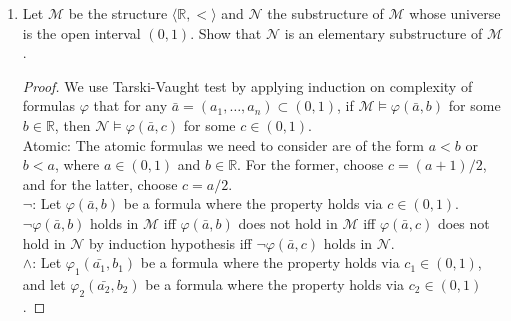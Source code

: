 \documentclass{article}
\begin{document}
\begin{enumerate}
\begin{enumerate}
\begin{proof}
          For each $n\in\mathbb{N}\setminus\{0,1\}$, $S_n$ is unique,
          hence we have infinitely many minimal definable and infinite
          subsets $S_n$.
        \end{proof}
    \end{enumerate}

  \item Let $\mathcal{M}$ be the structure
    $\langle\mathbb{R},<\rangle$ and $\mathcal{N}$ the substructure of
    $\mathcal{M}$ whose universe is the open interval $(0,1)$. Show
    that $\mathcal{N}$ is an elementary substructure of $\mathcal{M}$.

    \begin{proof}
      We use Tarski-Vaught test by applying induction on complexity of
      formulas $\varphi$ that for any
      $\bar{a}=(a_1,\ldots,a_n)\subset(0,1)$, if
      $\mathcal{M}\models\varphi(\bar{a},b)$ for some $b\in\mathbb{R}$,
      then $\mathcal{N}\models\varphi(\bar{a},c)$ for some $c\in(0,1)$. \\

      Atomic: The atomic formulas we need to consider are of the
      form $a<b$ or $b<a$, where $a\in(0,1)$ and $b\in\mathbb{R}$. For the
      former, choose $c=(a+1)/2$, and for the latter, choose $c=a/2$. \\

      $\neg$: Let $\varphi(\bar{a},b)$ be a formula where the property
      holds via $c\in(0,1)$. $\neg\varphi(\bar{a},b)$ holds in
      $\mathcal{M}$ iff $\varphi(\bar{a},b)$ does not hold in $\mathcal{M}$
      iff $\varphi(\bar{a},c)$ does not hold in $\mathcal{N}$ by induction
      hypothesis iff $\neg\varphi(\bar{a},c)$ holds in $\mathcal{N}$. \\

      $\wedge$: Let $\varphi_1(\bar{a_1},b_1)$ be a formula where the
      property holds via $c_1\in(0,1)$, and let $\varphi_2(\bar{a_2},b_2)$
      be a formula where the property holds via $c_2\in(0,1)$.
    \end{proof}



\end{enumerate}
\end{document}
